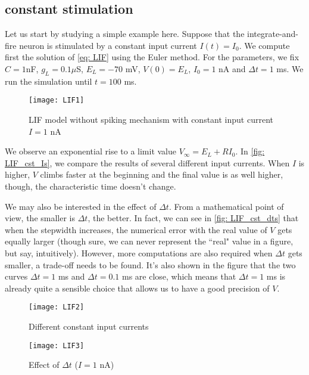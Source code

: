 \subsection{constant stimulation}

Let us start by studying a simple example here. Suppose that the
integrate-and-fire neuron is stimulated by a constant input current 
$I(t) = I_0$. We compute first the solution of \eqref{eq: LIF} using the Euler
method. For the parameters, we fix $C = 1$nF, $g_L = 0.1 \mu$S, $E_L = -70$
mV, $V(0) = E_L$, $I_0 = 1$ nA and $\Delta t = 1$ ms. We run the simulation
until $t = 100$ ms.

\vspace{-1em}
\begin{figure}[H]
  \centering
  \texttt{[image: LIF1]}
  \caption{LIF model without spiking mechanism 
           with constant input current $I = 1$ nA}
\end{figure}

We observe an exponential rise to a limit value $V_{\infty} = E_L + RI_0$. In
\autoref{fig: LIF_cst_Is}, we compare the results of several different input 
currents. When $I$ is higher, $V$ climbs faster at the beginning and the final
value is as well higher, though, the characteristic time doesn't change. 

We may also be interested in the effect of $\Delta t$. From a mathematical
point of view, the smaller is $\Delta t$, the better. In fact, we can see in
\autoref{fig: LIF_cst_dts} that when the stepwidth increases, the numerical
error with the real value of $V$ gets equally larger (though sure, we can
never represent the ``real" value in a figure, but say, intuitively). 
However, more computations are also required when $\Delta t$ gets smaller, a
trade-off needs to be found. It's also shown in the figure that
the two curves $\Delta t = 1$ ms and $\Delta t = 0.1$ ms are close,
which means that $\Delta t = 1$ ms is already quite a sensible choice that 
allows us to have a good precision of $V$.

\vspace{-1em}
\begin{figure}[H]
  \centering
  \texttt{[image: LIF2]}
  \caption{Different constant input currents}
  \label{fig: LIF_cst_Is}
\end{figure}

\vspace{-1em}
\begin{figure}[H]
  \centering
  \texttt{[image: LIF3]}
  \caption{Effect of $\Delta t$ ($I = 1$ nA)}
  \label{fig: LIF_cst_dts}
\end{figure}

